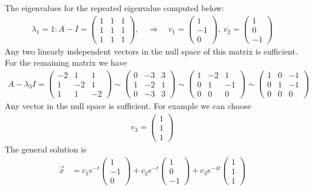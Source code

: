 \ifnum {} {\color{DarkBlue} The eigenvalues for the repeated eigenvalue computed below:
\begin{align}
    \lambda_1 = 1: A - I = \begin{pmatrix} 1&1&1 \\1&1&1\\1&1&1\end{pmatrix}, \quad \Rightarrow \quad v_1 = \begin{pmatrix} 1\\-1\\0\end{pmatrix}, \ v_2 = \begin{pmatrix} 1\\0\\-1\end{pmatrix}
\end{align}
Any two linearly independent vectors in the null space of this matrix is sufficient.  For the remaining matrix we have
\begin{align}
    A - \lambda_3I = \begin{pmatrix} -2&1&1\\1&-2&1\\1&1&-2\end{pmatrix} \sim  \begin{pmatrix} 0&-3&3  \\1&-2&1\\0&-3&3\end{pmatrix}\sim  \begin{pmatrix} 1&-2&1\\0&1&-1\\0&0&0\end{pmatrix}\sim  \begin{pmatrix} 1&0&-1\\0&1&-1\\0&0&0\end{pmatrix} 
\end{align}
Any vector in the null space is sufficient. For example we can choose
\begin{align}
    v_3 = \begin{pmatrix} 1\\1\\1\end{pmatrix}
\end{align}
The general solution is
\begin{align}
    \vec x &= 
    c_1e^{-t}\begin{pmatrix} 1\\-1\\0\end{pmatrix}
    +c_2 e^{-t}\begin{pmatrix} 1\\0\\-1\end{pmatrix}
    +c_3 e^{-4t}\begin{pmatrix} 1\\1\\1\end{pmatrix}
\end{align}
} 
\else 
\vspace{3cm}
\fi
\fi


